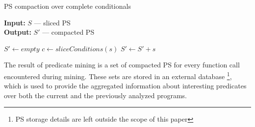 \begin{algorithm}[tbh]
\caption{PS compaction over complete conditionals}
\label{alg:complete-group-compaction}

\textbf{Input:}  $S$  --- sliced PS\\
\textbf{Output:} $S'$ --- compacted PS

\begin{algorithmic}
\State $S' \leftarrow empty$
    \State $c \leftarrow sliceConditions(s)$
        \State $S' \leftarrow S' + s$
    \EndIf
\EndFor
\end{algorithmic}
\end{algorithm}

The result of predicate mining is a set of compacted PS for every function call encountered during mining. These sets are stored in an external database%
\footnote{PS storage details are left outside the scope of this paper},
which is used to provide the aggregated information about interesting predicates over both the current and the previously analyzed programs.
